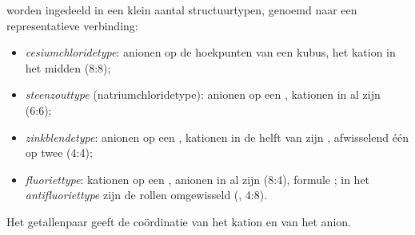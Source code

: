 \begin{definition}[Structuurtypen]\label{def:b1:crystals-ionic-covalent:structure-type}
 worden ingedeeld in een klein aantal structuurtypen,
genoemd naar een representatieve verbinding:
\begin{itemize}
  \item \emph{cesiumchloridetype}: anionen op de
        hoekpunten van een kubus, het kation in het midden (8:8);
  \item \emph{steenzouttype} (natriumchloridetype):
        anionen op een , kationen in al zijn  (6:6);
  \item \emph{zinkblendetype}: anionen op een
        , kationen in de helft van zijn ,
        afwisselend één op twee (4:4);
  \item \emph{fluoriettype}: kationen op een
        , anionen in al zijn  (8:4),
        formule ; in het
        \emph{antifluoriettype} zijn de rollen
        omgewisseld (, 4:8).
\end{itemize}
Het getallenpaar geeft de coördinatie van het kation en van het anion.
\end{definition}

